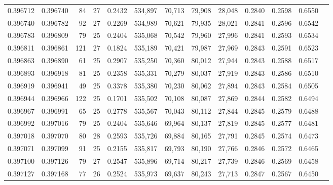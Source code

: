 \begin{tabular}{rrrrrrrrrrrrr}
0.396712 & 0.396740 &    84 &  27 &                                     0.2432 & 534,897 &  70,713 &  79,908 &  28,048 & 0.2840 & 0.2598 & 0.6550 \\
0.396740 & 0.396782 &    92 &  27 &                                     0.2269 & 534,989 &  70,621 &  79,935 &  28,021 & 0.2841 & 0.2596 & 0.6542 \\
0.396783 & 0.396809 &    79 &  25 &                                     0.2404 & 535,068 &  70,542 &  79,960 &  27,996 & 0.2841 & 0.2593 & 0.6534 \\
0.396811 & 0.396861 &   121 &  27 &                                     0.1824 & 535,189 &  70,421 &  79,987 &  27,969 & 0.2843 & 0.2591 & 0.6523 \\
0.396863 & 0.396890 &    61 &  25 &                                     0.2907 & 535,250 &  70,360 &  80,012 &  27,944 & 0.2843 & 0.2588 & 0.6517 \\
0.396893 & 0.396918 &    81 &  25 &                                     0.2358 & 535,331 &  70,279 &  80,037 &  27,919 & 0.2843 & 0.2586 & 0.6510 \\
0.396919 & 0.396941 &    49 &  25 &                                     0.3378 & 535,380 &  70,230 &  80,062 &  27,894 & 0.2843 & 0.2584 & 0.6505 \\
0.396944 & 0.396966 &   122 &  25 &                                     0.1701 & 535,502 &  70,108 &  80,087 &  27,869 & 0.2844 & 0.2582 & 0.6494 \\
0.396967 & 0.396991 &    65 &  25 &                                     0.2778 & 535,567 &  70,043 &  80,112 &  27,844 & 0.2845 & 0.2579 & 0.6488 \\
0.396992 & 0.397016 &    79 &  25 &                                     0.2404 & 535,646 &  69,964 &  80,137 &  27,819 & 0.2845 & 0.2577 & 0.6481 \\
0.397018 & 0.397070 &    80 &  28 &                                     0.2593 & 535,726 &  69,884 &  80,165 &  27,791 & 0.2845 & 0.2574 & 0.6473 \\
0.397071 & 0.397099 &    91 &  25 &                                     0.2155 & 535,817 &  69,793 &  80,190 &  27,766 & 0.2846 & 0.2572 & 0.6465 \\
0.397100 & 0.397126 &    79 &  27 &                                     0.2547 & 535,896 &  69,714 &  80,217 &  27,739 & 0.2846 & 0.2569 & 0.6458 \\
0.397127 & 0.397168 &    77 &  26 &                                     0.2524 & 535,973 &  69,637 &  80,243 &  27,713 & 0.2847 & 0.2567 & 0.6450 \\

\end{tabular}
